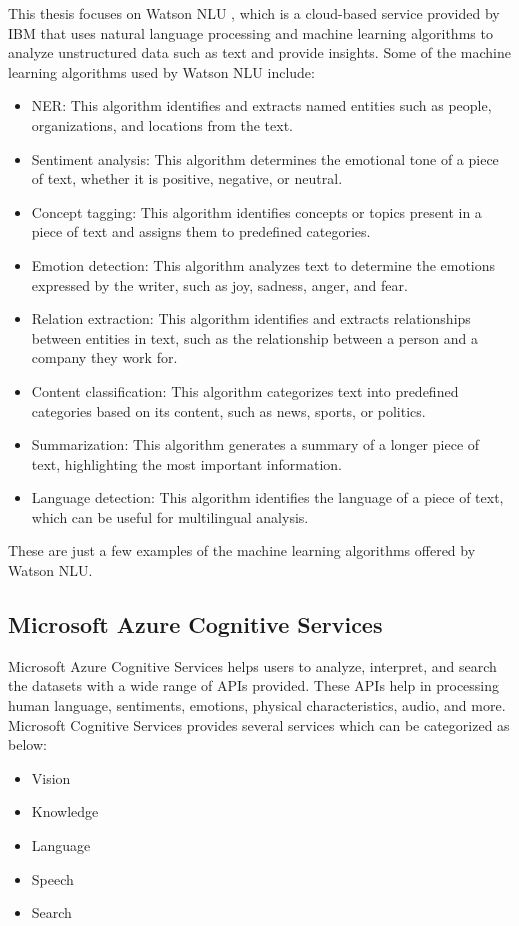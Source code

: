 This thesis focuses on Watson \ac{NLU} \cite{watsonnlu}, which is a cloud-based service provided by \acs{IBM} that uses natural language processing and machine learning algorithms to analyze unstructured data such as text and provide insights. Some of the machine learning algorithms used by Watson \acs{NLU} include:

\begin{itemize}
    \item \ac{NER}: This algorithm identifies and extracts named entities such as people, organizations, and locations from the text.
    \item Sentiment analysis: This algorithm determines the emotional tone of a piece of text, whether it is positive, negative, or neutral.
    \item Concept tagging: This algorithm identifies concepts or topics present in a piece of text and assigns them to predefined categories.
    \item Emotion detection: This algorithm analyzes text to determine the emotions expressed by the writer, such as joy, sadness, anger, and fear.
    \item Relation extraction: This algorithm identifies and extracts relationships between entities in text, such as the relationship between a person and a company they work for.
    \item Content classification: This algorithm categorizes text into predefined categories based on its content, such as news, sports, or politics.
    \item Summarization: This algorithm generates a summary of a longer piece of text, highlighting the most important information.
    \item Language detection: This algorithm identifies the language of a piece of text, which can be useful for multilingual analysis.
\end{itemize}

These are just a few examples of the machine learning algorithms offered by Watson \acs{NLU}. 

\subsection{Microsoft Azure Cognitive Services}
Microsoft Azure Cognitive Services helps users to analyze, interpret, and search the datasets with a wide range of \acs{API}s provided. These \acs{API}s help in processing human language, sentiments, emotions, physical characteristics, audio, and more. 
Microsoft Cognitive Services\cite{azureCogOverview} \cite{del2018introducing} provides several services which can be categorized as below:
\begin{itemize}
    \item Vision
    \item Knowledge
    \item Language
    \item Speech
    \item Search
\end{itemize}

